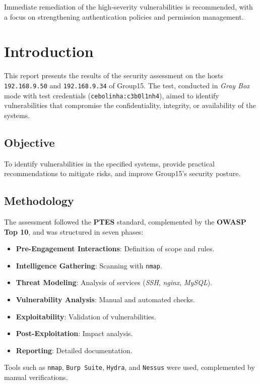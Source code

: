 \documentclass[a4paper,12pt]{article}
\begin{document}
Immediate remediation of the high-severity vulnerabilities is recommended, with a focus on strengthening authentication policies and permission management.

\section{Introduction}
This report presents the results of the security assessment on the hosts \texttt{192.168.9.50} and \texttt{192.168.9.34} of Group15. The test, conducted in \textit{Gray Box} mode with test credentials (\texttt{cebolinha:c3b0l1nh4}), aimed to identify vulnerabilities that compromise the confidentiality, integrity, or availability of the systems.

\subsection{Objective}
To identify vulnerabilities in the specified systems, provide practical recommendations to mitigate risks, and improve Group15's security posture.

\subsection{Methodology}
The assessment followed the \textbf{PTES} standard, complemented by the \textbf{OWASP Top 10}, and was structured in seven phases:
\begin{itemize}
    \item \textbf{Pre-Engagement Interactions}: Definition of scope and rules.
    \item \textbf{Intelligence Gathering}: Scanning with \texttt{nmap}.
    \item \textbf{Threat Modeling}: Analysis of services (\textit{SSH}, \textit{nginx}, \textit{MySQL}).
    \item \textbf{Vulnerability Analysis}: Manual and automated checks.
    \item \textbf{Exploitability}: Validation of vulnerabilities.
    \item \textbf{Post-Exploitation}: Impact analysis.
    \item \textbf{Reporting}: Detailed documentation.
\end{itemize}

Tools such as \texttt{nmap}, \texttt{Burp Suite}, \texttt{Hydra}, and \texttt{Nessus} were used, complemented by manual verifications.
\end{document}
